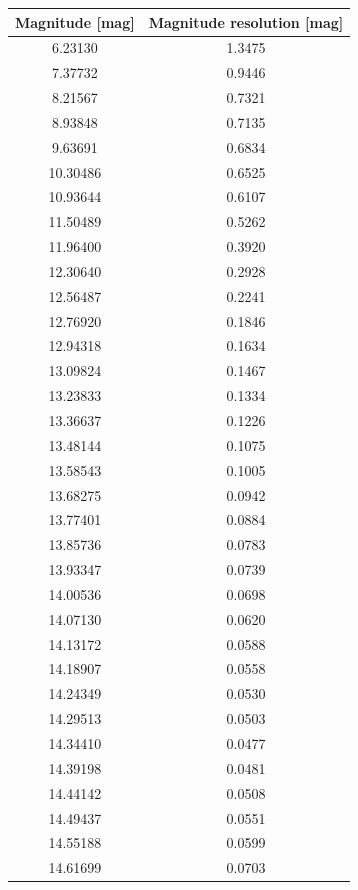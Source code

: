 \documentclass[fleqn,usenatbib]{mnras}
\begin{document}
\label{appexdix:magnitude-resolution}
\begin{table}
    \centering
    \begin{tabular}{c|c}
        Magnitude [mag] & Magnitude resolution [mag] \\\hline\hline
        6.23130  & 1.3475 \\
        7.37732  & 0.9446 \\
        8.21567  & 0.7321 \\
        8.93848  & 0.7135 \\
        9.63691  & 0.6834 \\\hline
        10.30486 & 0.6525 \\
        10.93644 & 0.6107 \\
        11.50489 & 0.5262 \\
        11.96400 & 0.3920 \\
        12.30640 & 0.2928 \\\hline
        12.56487 & 0.2241 \\
        12.76920 & 0.1846 \\
        12.94318 & 0.1634 \\
        13.09824 & 0.1467 \\
        13.23833 & 0.1334 \\\hline
        13.36637 & 0.1226 \\
        13.48144 & 0.1075 \\
        13.58543 & 0.1005 \\
        13.68275 & 0.0942 \\
        13.77401 & 0.0884 \\\hline
        13.85736 & 0.0783 \\
        13.93347 & 0.0739 \\
        14.00536 & 0.0698 \\
        14.07130 & 0.0620 \\
        14.13172 & 0.0588 \\\hline
        14.18907 & 0.0558 \\
        14.24349 & 0.0530 \\
        14.29513 & 0.0503 \\
        14.34410 & 0.0477 \\
        14.39198 & 0.0481 \\\hline
        14.44142 & 0.0508 \\
        14.49437 & 0.0551 \\
        14.55188 & 0.0599 \\
        14.61699 & 0.0703 \\

\end{tabular}
\end{table}
\end{document}
